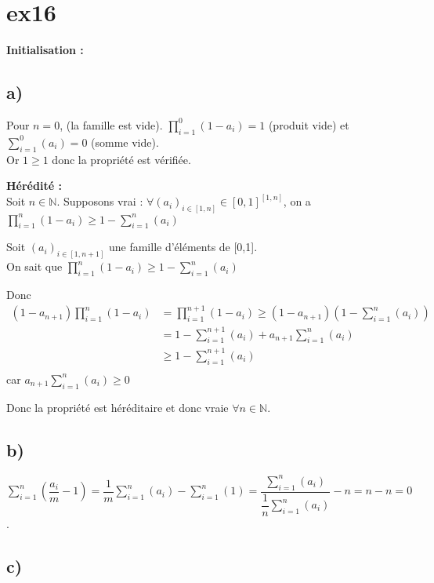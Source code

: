 \documentclass[11pt]{article}
\begin{document}
\section{ex16}

\textbf{Initialisation :} \\

\subsection*{a)}

Pour $n = 0$, (la famille est vide). $\prod_{i=1}^{0}(1-a_i) = 1$ (produit vide) et $\sum_{i=1}^{0}(a_i) = 0 $ (somme vide). \\

Or $1 \geq 1$ donc la propriété est vérifiée. 

\textbf{Hérédité :} \\
Soit $n \in \mathbb{N}$. Supposons vrai : $\forall (a_i)_{i \in [1,n]} \in [0,1]^{[1,n]}$, on a $\prod_{i=1}^{n}(1-a_i) \geq 1 - \sum_{i=1}^{n}(a_i)$ 


Soit $(a_i)_{i \in [1,n+1]}$ une famille d'éléments de [0,1]. \\

On sait que $\prod_{i=1}^{n}(1-a_i) \geq 1 - \sum_{i=1}^{n}(a_i)$ 

Donc 
\begin{align}
(1 - a_{n+1}) \prod_{i=1}^{n}(1-a_i) &= \prod_{i=1}^{n+1}(1-a_i) \geq (1 - a_{n+1}) (1 - \sum_{i=1}^{n}(a_i)) \\
                                     &= 1 - \sum_{i=1}^{n+1}(a_i) + a_{n+1} \sum_{i=1}^{n}(a_i) \\
                                     &\geq 1 - \sum_{i=1}^{n+1}(a_i) \\
\end{align}
car $a_{n+1} \sum_{i=1}^{n}(a_i) \geq 0$

Donc la propriété est héréditaire et donc vraie $\forall n \in \mathbb{N}$.

\subsection*{b)}

$\sum_{i=1}^{n}(\dfrac{a_i}{m} - 1 ) = \dfrac{1}{m} \sum_{i=1}^{n}(a_i) - \sum_{i=1}^{n}(1) = \dfrac{\sum_{i=1}^{n}(a_i)}{\dfrac{1}{n}\sum_{i=1}^{n}(a_i)} - n = n - n = 0$.

\subsection*{c)}
\end{document}
